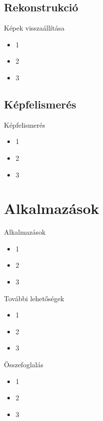 \documentclass{beamer}
\begin{document}
\subsection{Rekonstrukció}
\begin{frame}{Képek visszaállítása}
    \begin{itemize}
    \item 1
    \item 2
    \item 3
    \end{itemize}
\end{frame}

\subsection{Képfelismerés}
\begin{frame}{Képfelismerés}
    \begin{itemize}
    \item 1
    \item 2
    \item 3
    \end{itemize}
\end{frame}

\section{Alkalmazások}
\begin{frame}{Alkalmazások}
    \begin{itemize}
    \item 1
    \item 2
    \item 3
    \end{itemize}
\end{frame}

\begin{frame}{További lehetőségek}
    \begin{itemize}
    \item 1
    \item 2
    \item 3
    \end{itemize}
\end{frame}

\begin{frame}{Összefoglalás}
    \begin{itemize}
    \item 1
    \item 2
    \item 3
    \end{itemize}
\end{frame}
\end{document}
